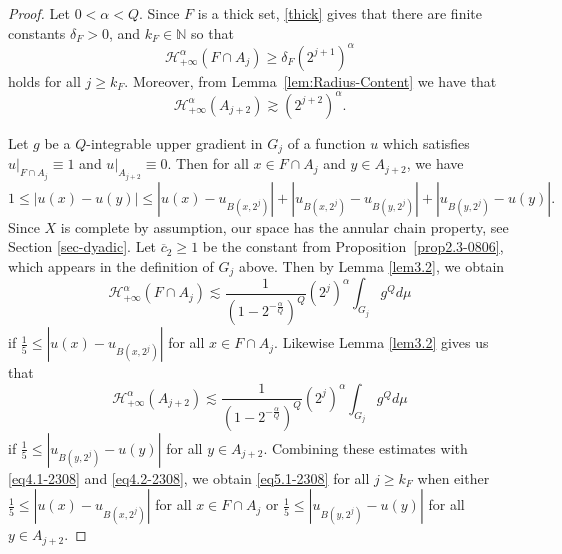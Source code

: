 \documentclass[10pt]{amsart}
\numberwithin{equation}{section}
\newcommand{\N}{\mathbb{N}}
\begin{document}
\begin{proof}
Let $0<\alpha<Q$.
Since $F$ is a thick set,  \eqref{thick} gives that there are finite constants $\delta_F>0$, and $k_F\in\N$ so that 
 \begin{equation}
 \label{eq4.1-2308}
 	\mathcal H^{\alpha}_{+\infty}(F\cap A_j)\geq \delta_F (2^{j+1})^\alpha
 \end{equation}
 holds for all 
   $j\ge k_F$. 
 Moreover, from Lemma~\ref{lem:Radius-Content} we have that 
 \begin{equation}
 \label{eq4.2-2308}
 	\mathcal H^{\alpha}_{+\infty}(A_{j+2})\gtrsim (2^{j+2})^\alpha.
 \end{equation} 
 
 Let $g$ be a $Q$-integrable upper gradient in $G_j$ of a function $u$ which satisfies  $u|_{F\cap A_j}\equiv 1$ and $u|_{A_{j+2}}\equiv 0$. 
 Then for all $x\in F\cap A_j$ and $y\in A_{j+2}$, we have
 \begin{equation}\label{eq4.2-0905}
 	1\leq |u(x)-u(y)|\leq |u(x)-u_{B(x, 2^j)}|+|u_{B(x,2^j)}-u_{B(y, 2^{j})}|+|u_{B(y, 2^{j})}-u(y)|.
 \end{equation}
Since $X$ is complete by assumption, our space has the  annular chain property, see Section \ref{sec-dyadic}.  Let $\overline c_2\ge 1$ be the constant from Proposition~\ref{prop2.3-0806}, which appears in the definition of $G_j$ above. Then by Lemma \ref{lem3.2}, we obtain 
 	\[
		\mathcal H^{\alpha}_{+\infty}(F\cap A_j)\lesssim  \frac{1}{(1-2^{-\frac{\alpha}{Q}})^Q}  (2^j)^\alpha \int_{G_j}g^Qd\mu
	\]
 if $\frac{1}{5}\leq |u(x)-u_{B(x, 2^j)}|$ for all $x\in F\cap A_j$.  Likewise Lemma \ref{lem3.2} gives us that 
 	\[
	\mathcal H^{\alpha}_{+\infty}(A_{j+2})\lesssim  \frac{1}{(1-2^{-\frac{\alpha}{Q}})^Q}  (2^{j})^\alpha \int_{G_j}g^Qd\mu
	\]
 if $\frac{1}{5}\leq |u_{B(y, 2^{j})}-u(y)|$ for all $y\in A_{j+2}$. Combining these estimates with \eqref{eq4.1-2308} and \eqref{eq4.2-2308}, we obtain \eqref{eq5.1-2308} for all $j\ge k_F$ when either $\frac{1}{5}\leq |u(x)-u_{B(x, 2^j)}|$ for all $x\in F\cap A_j$ or $\frac{1}{5}\leq |u_{B(y, 2^{j})}-u(y)|$ for all $y\in A_{j+2}$. 
 

\end{proof}
\end{document}
